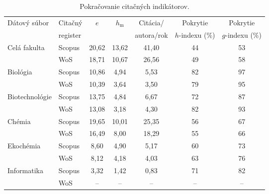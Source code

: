 \begin{table}
\centering\small
\caption{Pokračovanie citačných indikátorov.}
\label{tab:citation.indicators2}
\begin{tabular}{llccccc}
  \hline\noalign{\vspace{.3ex}}
  Dátový súbor & Citačný  & $e$ & $h_{\mathrm{m}}$ & Citácia/   & Pokrytie        & Pokrytie        \\
               & register &     &                  & autora/rok & $h$-indexu (\%) & $g$-indexu (\%) \\[0.3ex]
  \hline\noalign{\vspace{.5ex}}
  Celá fakulta   & Scopus & 20,62 & 13,62 & 41,40 & 44 & 53 \\
                 & WoS    & 18,71 & 10,67 & 26,56 & 49 & 58 \\[1ex]
  Biológia       & Scopus & 10,86 &  4,94 &  5,53 & 82 & 97 \\
                 & WoS    & 10,39 &  3,64 &  3,50 & 79 & 95 \\[1ex]
  Biotechnológie & Scopus & 13,75 &  4,84 &  6,67 & 72 & 87 \\
                 & WoS    & 13,08 &  3,18 &  4,30 & 82 & 93 \\[1ex]
  Chémia         & Scopus & 19,65 & 10,01 & 25,35 & 56 & 67 \\
                 & WoS    & 16,49 &  8,00 & 18,29 & 55 & 66 \\[1ex]
  Ekochémia      & Scopus &  8,60 &  4,90 &  5,17 & 60 & 73 \\
                 & WoS    &  8,12 &  4,18 &  4,03 & 63 & 76 \\[1ex]
  Informatika    & Scopus &  3,32 &  1,42 &  0,83 & 71 & 82 \\
                 & WoS    & --    & --    & --    & -- & -- \\[0.5ex]
  \hline
\end{tabular}
\end{table}


